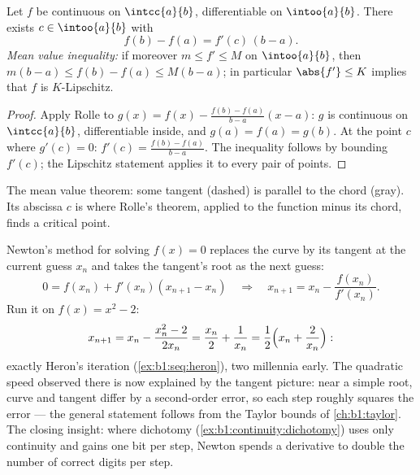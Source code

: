 \begin{theorem}\label{thm:b1:derivative:mvt}
Let $f$ be continuous on $\intcc{a}{b}$, differentiable on
$\intoo{a}{b}$. There exists $c \in \intoo{a}{b}$ with
\[
f(b) - f(a) = f'(c)\,(b - a) .
\]
\emph{Mean value inequality:} if moreover $m \leq f' \leq M$ on
$\intoo{a}{b}$, then $m(b-a) \leq f(b) - f(a) \leq M(b-a)$; in
particular $\abs{f'} \leq K$ implies that $f$ is $K$-Lipschitz.
\end{theorem}

\begin{proof}
Apply Rolle to $g(x) = f(x) - \frac{f(b) - f(a)}{b - a}(x - a)$: $g$
is continuous on $\intcc{a}{b}$, differentiable inside, and $g(a) =
f(a) = g(b)$. At the point $c$ where $g'(c) = 0$: $f'(c) =
\frac{f(b)-f(a)}{b-a}$. The inequality follows by bounding $f'(c)$;
the Lipschitz statement applies it to every pair of points.
\end{proof}

\begin{omfigure}

{\small The mean value theorem: some tangent (dashed) is parallel to
the chord (gray). Its abscissa $c$ is where Rolle's theorem, applied
to the function minus its chord, finds a critical point.}
\end{omfigure}

\begin{example}\label{ex:b1:derivative:newton}
Newton's method for solving $f(x) = 0$ replaces the curve by
its tangent at the current guess $x_n$ and takes the tangent's
root as the next guess:
\[
0 = f(x_n) + f'(x_n)(x_{n+1} - x_n)
\quad\Longrightarrow\quad
x_{n+1} = x_n - \frac{f(x_n)}{f'(x_n)} .
\]
Run it on $f(x) = x^2 - 2$:
\[
x_{n+1} = x_n - \frac{x_n^2 - 2}{2x_n}
= \frac{x_n}{2} + \frac{1}{x_n}
= \frac12\Bigl(x_n + \frac{2}{x_n}\Bigr) :
\]
exactly Heron's iteration (\cref{ex:b1:seq:heron}), two
millennia early. The quadratic speed observed there is now
explained by the tangent picture: near a simple root, curve and
tangent differ by a second-order error, so each step roughly
squares the error --- the general statement follows from the
Taylor bounds of \cref{ch:b1:taylor}. The closing insight:
where dichotomy (\cref{ex:b1:continuity:dichotomy}) uses only
continuity and gains one bit per step, Newton spends a
derivative to double the number of correct digits per step.
\end{example}

